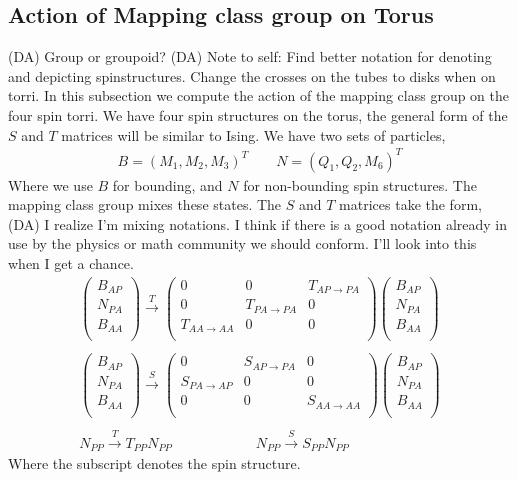 \documentclass[12pt,a4paper]{article}
\newcounter{arrow}
\newcommand{\dave}[1]{{\color{ao(english)}\footnotesize{(DA) #1}}}
\begin{document}
\subsection{Action of Mapping class group on Torus }
\dave{Group or groupoid?}
\dave{Note to self: Find better notation for denoting and depicting spinstructures. Change the crosses on the tubes to disks when on torri.}
In this subsection we compute the action of the mapping class group on the four spin torri. 
We have four spin structures on the torus, the general form of the $S$ and $T$ matrices will be similar to Ising. 
We have two sets of particles, 
\begin{align}
B = (M_1, M_2, M_3)^{T} \quad \quad N = (Q_1, Q_2, M_6)^{T}
\end{align}
Where we use $B$ for bounding, and $N$ for non-bounding spin structures.
The mapping class group mixes these states. 
The $S$ and $T$ matrices take the form,
\dave{I realize I'm mixing notations. I think if there is a good notation already in use by the physics or math community we should conform. I'll look into this when I get a chance.}
\begin{align}
\left(\begin{matrix}
B_{AP}\\
N_{PA} \\
B_{AA} \\
\end{matrix} \right)
\xrightarrow{T} \left( \begin{matrix}
0 & 0 & T_{AP \rightarrow PA} \\
0 & T_{PA \rightarrow PA} & 0 \\
T_{AA \rightarrow AA} & 0 & 0 \\
\end{matrix} \right)
\left(\begin{matrix}
B_{AP}\\
N_{PA} \\
B_{AA} \\
\end{matrix} \right)\\
\\
\left(\begin{matrix}
B_{AP}\\
N_{PA} \\
B_{AA} \\
\end{matrix} \right)
\xrightarrow{S} \left( \begin{matrix}
0 & S_{AP \rightarrow PA} &0 \\
S_{PA \rightarrow AP} & 0 & 0 \\
0& 0 & S_{AA \rightarrow AA} \\
\end{matrix} \right)
\left(\begin{matrix}
B_{AP}\\
N_{PA} \\
B_{AA} \\
\end{matrix} \right)\\
\\
N_{PP} \xrightarrow{T} T_{PP} N_{PP} \qquad\qquad\qquad N_{PP} \xrightarrow{S} S_{PP} N_{PP} 
\end{align}
Where the subscript denotes the spin structure. 
\end{document}
